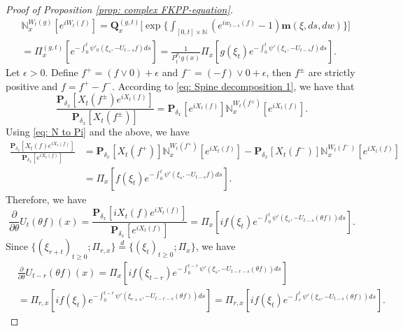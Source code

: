 \documentclass[EJP]{ejpecp} %
\begin{document}
\begin{proof}[Proof of Proposition \ref{prop: complex FKPP-equation}]
\begin{align}
\label{eq: N to Pi}
 	& \mathbb N_x^{ W_t( g)}[e^{i W_t(f)}]
   	= \mathbf Q_x^{(g,t)} \Big[\exp\Big\{\int_{[0,t]\times \mathbb N}(e^{i w_{t-s}(f)} - 1) \mathbf m(\xi, ds,dw)\Big\}\Big]
    \\ & = \Pi_x^{(g,t)} [e^{-\int_0^t \psi'_0(\xi_s, -U_{t-s}f)ds}]
    = \frac{1}{P_t^{\rho_1} g (x)} \Pi_x[ g(\xi_t) e^{-\int_0^t \psi'(\xi_s, -U_{t-s}f)ds} ].
\end{align}
	Let $\epsilon >0$.
	Define $f^+ = (f \vee 0) + \epsilon$ and $f^- = (-f) \vee 0 + \epsilon$, then $f^\pm$ are strictly positive and $f = f^+ - f^-$.
	According to \eqref{eq: Spine decomposition 1}, we have that
\[
    \frac{\mathbf P_{\delta_x}[X_t(f^{\pm}) e^{i X_t(f)}]}{\mathbf P_{\delta_x}[X_t(f^{\pm}) ]}
    = \mathbf P_{\delta_x}[e^{i X_t(f)}] \mathbb N_x^{ W_t(f^{\pm})}[e^{i X_t(f)}].
\]
	Using \eqref{eq: N to Pi} and the above, we have
\begin{align}
    \frac{\mathbf P_{\delta_x}[X_t(f) e^{i X_t(f)}] }{\mathbf P_{\delta_x}[e^{i X_t(f)}]}
    & = \mathbf P_{\delta_x}[X_t(f^+)] \mathbb N_x^{W_t(f^+)} [e^{i X_t(f)}] - \mathbf P_{\delta_x}[X_t(f^-)]\mathbb N_x^{W_t(f^-)}[e^{i X_t(f)}]
    \\ & = \Pi_x[ f(\xi_t) e^{- \int_0^t \psi'(\xi_s, -U_{t-s}f) ds}  ].
\end{align}
	Therefore, we have
\[
    \frac{\partial}{\partial \theta} {U_t(\theta f)(x)}
    = \frac{\mathbf P_{\delta_x}[i X_t(f) e^{i X_t(f)}] }{\mathbf P_{\delta_x}[e^{i X_t(f)}]}
    = \Pi_x[ if(\xi_t) e^{ - \int_0^t \psi'(\xi_s, -U_{t-s}(\theta f)) ds} ].
\]
	Since $\{(\xi_{r+t})_{t \geq 0}; \Pi_{r,x}\} \overset{d}{=} \{(\xi_{t})_{t\geq 0}; \Pi_{x}\} $, we have
\begin{align}
    & \frac{\partial}{\partial \theta} U_{t-r}(\theta f)( x)
   	= \Pi_x[ i f(\xi_{t-r}) e^{-\int_0^{t-r} \psi'(\xi_s, -U_{t-r-s}(\theta f)) ds} ] \\
    & = \Pi_{r,x}[i f(\xi_t)e^{-\int_0^{t-r} \psi'(\xi_{r+s}, -U_{t-r-s}(\theta f)) ds} ]
    = \Pi_{r,x}[if(\xi_t)e^{-\int_r^t \psi'(\xi_{s}, -U_{t-s}(\theta f)) ds} ].
\end{align}


\end{proof}
\end{document}
